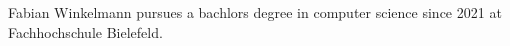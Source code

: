 \documentclass[10pt,journal,compsoc]{IEEEtran}
\begin{document}
%
%
%





% 


\begin{IEEEbiographynophoto}{Fabian Winkelmann}
  pursues a bachlors degree in computer
  science since 2021 at Fachhochschule Bielefeld.
\end{IEEEbiographynophoto}








\end{document}
